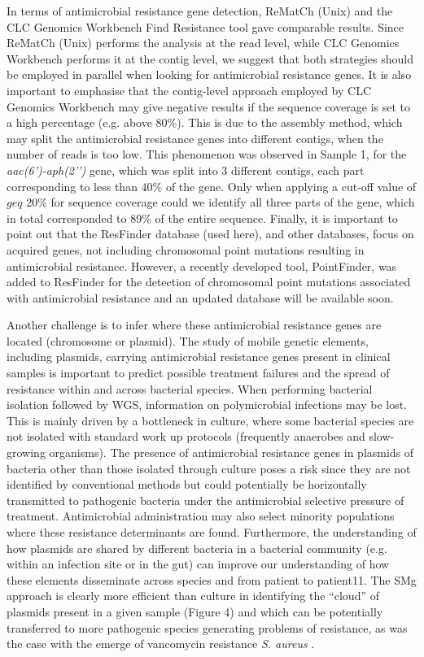 In terms of antimicrobial resistance gene detection, ReMatCh (Unix) and the CLC Genomics Workbench Find Resistance tool gave comparable results. Since ReMatCh (Unix) performs the analysis at the read level, while CLC Genomics Workbench performs it at the contig level, we suggest that both strategies should be employed in parallel when looking for antimicrobial resistance genes. It is also important to emphasise that the contig-level approach employed by CLC Genomics Workbench may give negative results if the sequence coverage is set to a high percentage (e.g. above 80\%). This is due to the assembly method, which may split the antimicrobial resistance genes into different contigs, when the number of reads is too low. This phenomenon was observed in Sample 1, for the \textit{aac(6’)-aph(2’’)} gene, which was split into 3 different contigs, each part corresponding to less than 40\% of the gene. Only when applying a cut-off value of $geq$ 20\% for sequence coverage could we identify all three parts of the gene, which in total corresponded to 89\% of the entire sequence. Finally, it is important to point out that the ResFinder database (used here), and other databases, focus on acquired genes, not including chromosomal point mutations resulting in antimicrobial resistance. However, a recently developed tool, PointFinder, was added to ResFinder for the detection of chromosomal point mutations associated with antimicrobial resistance \citep{zankari_pointfinder_2017} and an updated database will be available soon.

Another challenge is to infer where these antimicrobial resistance genes are located (chromosome or plasmid). The study of mobile genetic elements, including plasmids, carrying antimicrobial resistance genes present in clinical samples is important to predict possible treatment failures and the spread of resistance within and across bacterial species. When performing bacterial isolation followed by WGS, information on polymicrobial infections may be lost. This is mainly driven by a bottleneck in culture, where some bacterial species are not isolated with standard work up protocols (frequently anaerobes and slow-growing organisms). The presence of antimicrobial resistance genes in plasmids of bacteria other than those isolated through culture poses a risk since they are not identified by conventional methods but could potentially be horizontally transmitted to pathogenic bacteria under the antimicrobial selective pressure of treatment. Antimicrobial administration may also select minority populations where these resistance determinants are found. Furthermore, the understanding of how plasmids are shared by different bacteria in a bacterial community (e.g. within an infection site or in the gut) can improve our understanding of how these elements disseminate across species and from patient to patient11. The SMg approach is clearly more efficient than culture in identifying the “cloud” of plasmids present in a given sample (Figure 4) and which can be potentially transferred to more pathogenic species generating problems of resistance, as was the case with the emerge of vancomycin resistance \textit{S. aureus} \citep{melo-cristino_first_2013}.

